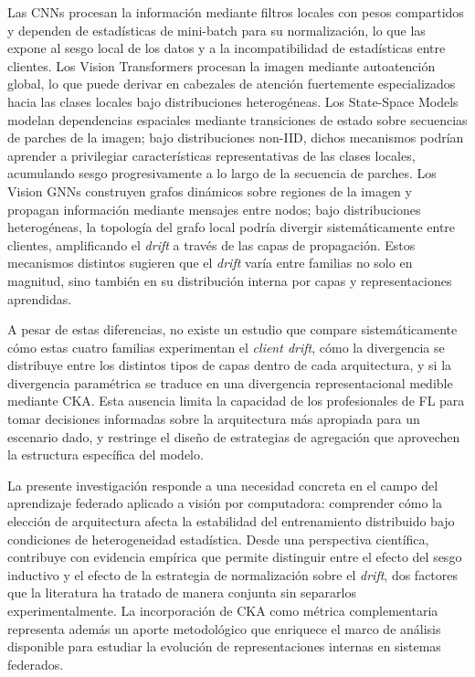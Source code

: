 Las CNNs procesan la información mediante filtros locales con pesos compartidos y dependen de 
estadísticas de mini-batch para su normalización, lo que las expone al sesgo local de los datos 
y a la incompatibilidad de estadísticas entre clientes. Los Vision Transformers procesan la 
imagen mediante autoatención global, lo que puede derivar en cabezales de atención fuertemente 
especializados hacia las clases locales bajo distribuciones heterogéneas. Los State-Space Models 
modelan dependencias espaciales mediante transiciones de estado sobre secuencias de parches de 
la imagen; bajo distribuciones non-IID, dichos mecanismos podrían aprender a privilegiar 
características representativas de las clases locales, acumulando sesgo progresivamente a lo 
largo de la secuencia de parches. Los Vision GNNs construyen grafos dinámicos sobre regiones 
de la imagen y propagan información mediante mensajes entre nodos; bajo distribuciones 
heterogéneas, la topología del grafo local podría divergir sistemáticamente entre clientes, 
amplificando el \textit{drift} a través de las capas de propagación. Estos mecanismos 
distintos sugieren que el \textit{drift} varía entre familias no solo en 
magnitud, sino también en su distribución interna por capas y representaciones aprendidas.

A pesar de estas diferencias, no existe un estudio que compare sistemáticamente cómo estas cuatro 
familias experimentan el \textit{client drift}, cómo la 
divergencia se distribuye entre los distintos tipos de capas dentro de cada arquitectura, y 
si la divergencia paramétrica se traduce en una divergencia representacional medible mediante 
CKA. Esta ausencia limita la capacidad de los profesionales de FL para tomar decisiones 
informadas sobre la arquitectura más apropiada para un escenario dado, y restringe el diseño 
de estrategias de agregación que aprovechen la estructura específica del modelo.



La presente investigación responde a una necesidad concreta en el campo del aprendizaje 
federado aplicado a visión por computadora: comprender cómo la elección de arquitectura 
afecta la estabilidad del entrenamiento distribuido bajo condiciones de heterogeneidad 
estadística. Desde una perspectiva científica, contribuye con evidencia empírica que permite 
distinguir entre el efecto del sesgo inductivo y el efecto de la estrategia de normalización 
sobre el \textit{drift}, dos factores que la literatura ha tratado de manera conjunta sin 
separarlos experimentalmente. La incorporación de CKA como métrica complementaria representa 
además un aporte metodológico que enriquece el marco de análisis disponible para estudiar la 
evolución de representaciones internas en sistemas federados.

